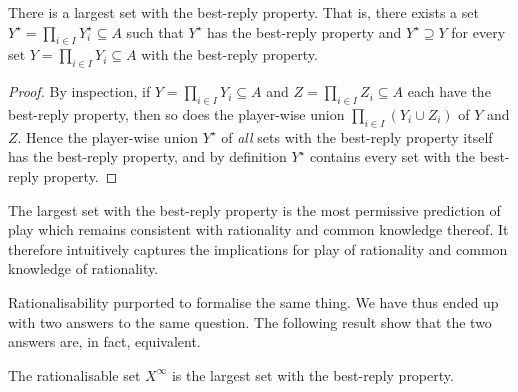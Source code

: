 \begin{observation}
	\label{observation:br_property_max}
	There is a largest set with the best-reply property. That is, there exists a set $Y^\star = \prod_{i \in I} Y^\star_i \subseteq A$ such that $Y^\star$ has the best-reply property and $Y^\star \supseteq Y$ for every set $Y = \prod_{i \in I} Y_i \subseteq A$ with the best-reply property.
\end{observation}

\begin{proof}
	By inspection, if $Y = \prod_{i \in I} Y_i \subseteq A$ and $Z = \prod_{i \in I} Z_i \subseteq A$ each have the best-reply property, then so does the player-wise union $\prod_{i \in I} ( Y_i \cup Z_i )$ of $Y$ and $Z$. Hence the player-wise union $Y^\star$ of \emph{all} sets with the best-reply property itself has the best-reply property, and by definition $Y^\star$ contains every set with the best-reply property.
\end{proof}

The largest set with the best-reply property is the most permissive prediction of play which remains consistent with rationality and common knowledge thereof. It therefore intuitively captures the implications for play of rationality and common knowledge of rationality.

Rationalisability purported to formalise the same thing. We have thus ended up with two answers to the same question. The following result show that the two answers are, in fact, equivalent.

\begin{proposition}
	\label{proposition:br_property}
	The rationalisable set $X^\infty$ is the largest set with the best-reply property.
\end{proposition}

